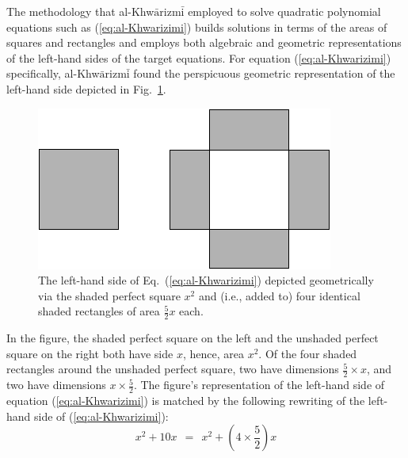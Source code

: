 \bigskip

The methodology that al-Khw$\bar{\mbox{a}}$rizm$\bar{\mbox{i}}$ employed to solve quadratic polynomial equations such as (\ref{eq:al-Khwarizimi}) builds solutions in terms of the areas of squares and rectangles and employs both algebraic and geometric representations of the left-hand sides of the target equations.  For equation (\ref{eq:al-Khwarizimi}) specifically, al-Khw$\bar{\mbox{a}}$rizm$\bar{\mbox{i}}$ found the perspicuous geometric representation of the left-hand side depicted in Fig.~\ref{fig:EqElKwarismi1}.
\begin{figure}[ht]
\begin{center}
       \includegraphics[scale=0.4]{FiguresArithmetic/EquationElKwarismi1}
\caption{The left-hand side of Eq.~(\ref{eq:al-Khwarizimi}) depicted geometrically via the shaded perfect square $x^2$ and (i.e., added to) four identical shaded rectangles of area $\frac{5}{2} x$ each.}
       \label{fig:EqElKwarismi1}
\end{center}
\end{figure}
In the figure, the shaded perfect square on the left and the unshaded perfect square on the right both have side $x$, hence, area $x^2$.  Of the four shaded rectangles around the unshaded perfect square, two have dimensions $\frac{5}{2} \times x$, and two have dimensions $x \times \frac{5}{2}$.  The figure's representation of the left-hand side of equation (\ref{eq:al-Khwarizimi}) is matched by the following rewriting of the left-hand side of (\ref{eq:al-Khwarizimi}):
\[ x^2 + 10 x \ \ = \ \ x^2 + \left( 4 \times \frac{5}{2} \right) x \]

